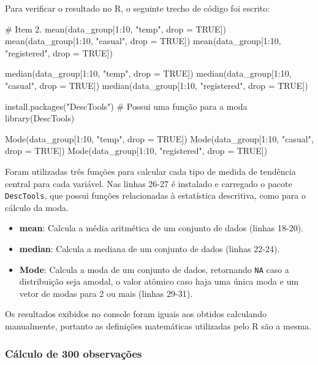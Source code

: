 \documentclass[a4paper, 12pt, titlepage]{article}
\begin{document}
\noindent Para verificar o resultado no R, o seguinte trecho de código foi escrito:

\begin{rcode}[firstnumber=19, caption={Cálculo das 10 observações (1)},breaklines=true, breakatwhitespace=true]
    # Item 2.
    mean(data_group[1:10, "temp", drop = TRUE])
    mean(data_group[1:10, "casual", drop = TRUE])
    mean(data_group[1:10, "registered", drop = TRUE])
    
    median(data_group[1:10, "temp", drop = TRUE])
    median(data_group[1:10, "casual", drop = TRUE])
    median(data_group[1:10, "registered", drop = TRUE])
    
    install.packages("DescTools") # Possui uma função para a moda
    library(DescTools)
    
    Mode(data_group[1:10, "temp", drop = TRUE])
    Mode(data_group[1:10, "casual", drop = TRUE])
    Mode(data_group[1:10, "registered", drop = TRUE])
\end{rcode}

Foram utilizadas três funções para calcular cada tipo de medida de tendência central para cada variável. Nas linhas 26-27 é instalado e carregado o pacote \texttt{DescTools}, que possui funções relacionadas à estatística descritiva, como para o cálculo da moda.

\begin{itemize}
    \item \textbf{mean}: Calcula a média aritmética de um conjunto de dados (linhas 18-20).
    \item \textbf{median}: Calcula a mediana de um conjunto de dados (linhas 22-24).
    \item \textbf{Mode}: Calcula a moda de um conjunto de dados, retornando \texttt{NA} caso a distribuição seja amodal, o valor atômico caso haja uma única moda e um vetor de modas para 2 ou mais (linhas 29-31).
\end{itemize}

Os resultados exibidos no console foram iguais aos obtidos calculando manualmente, portanto as definições matemáticas utilizadas pelo R são a mesma.


\subsubsection*{Cálculo de 300 observações}
\end{document}
